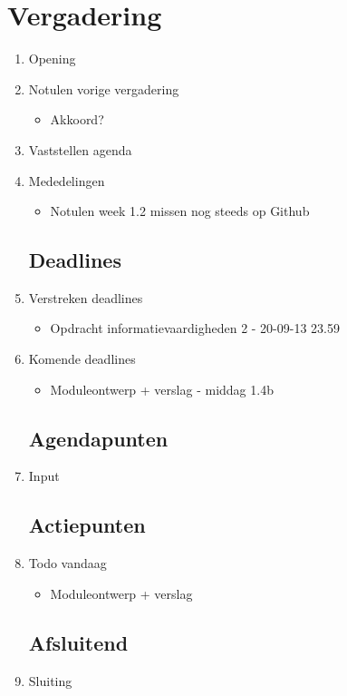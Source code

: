 \documentclass{article}
\begin{document}
\section*{Vergadering}
\begin{enumerate}
	
	\subsection*{Vooraf}
	\item Opening
	\item Notulen vorige vergadering
	\begin{itemize}
		\item Akkoord?
	\end{itemize}
	\item Vaststellen agenda
	\item Mededelingen
	\begin{itemize}
		\item Notulen week 1.2 missen nog steeds op Github
	\end{itemize}

	\subsection*{Deadlines}
	\item Verstreken deadlines
	\begin{itemize}
		\item Opdracht informatievaardigheden 2 - 20-09-13 23.59
	\end{itemize}
	\item Komende deadlines
	\begin{itemize}
		\item Moduleontwerp + verslag - middag 1.4b
	\end{itemize}

	\subsection*{Agendapunten}
	\item Input
	

	\subsection*{Actiepunten}
	\item Todo vandaag
	\begin{itemize}
		\item Moduleontwerp + verslag
	\end{itemize}

	\noindent 
	\subsection*{Afsluitend}
	\item Sluiting

\end{enumerate}
\end{document}
